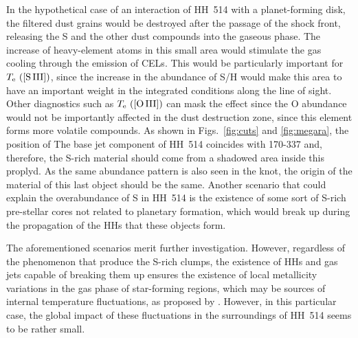 \documentclass[fleqn,usenatbib]{mnras}
\begin{document}
In the hypothetical case of an interaction of HH~514 with a planet-forming disk, the filtered dust grains would be destroyed after the passage of the shock front, releasing the S and the other dust compounds into the gaseous phase. The increase of heavy-element atoms in this small area would stimulate the gas cooling through the emission of CELs. This would be particularly important for $T_{\rm e} \text{ ([S\thinspace III])}$, since the increase in the abundance of S/H would make this area to have an important weight in the integrated conditions along the line of sight. Other diagnostics such as $T_{\rm e} \text{ ([O\thinspace III])}$ can mask the effect since the O abundance would not be importantly affected in the dust destruction zone, since this element forms more volatile compounds. 
As shown in Figs.~\ref{fig:cuts} and \ref{fig:megara}, the position of 
The base jet component of HH~514 coincides with 170-337 and, therefore, the S-rich material should come from a shadowed area inside this proplyd. As the same abundance pattern is also seen in the knot, the origin of the material of this last object should be the same. Another scenario that could explain the overabundance of S in HH~514 is the existence of some sort of S-rich pre-stellar cores not related to planetary formation, which would break up during the propagation of the HHs that these objects form.  


The aforementioned scenarios merit further investigation. However, regardless of the phenomenon that produce the S-rich clumps, the existence of HHs and gas jets capable of breaking them up ensures the existence of local metallicity variations in the gas phase of star-forming regions, which may be sources of internal temperature fluctuations, as proposed by \citet{Peimbert67}. However, in this particular case, the global impact of these fluctuations in the surroundings of HH~514 seems to be rather small.


\end{document}
